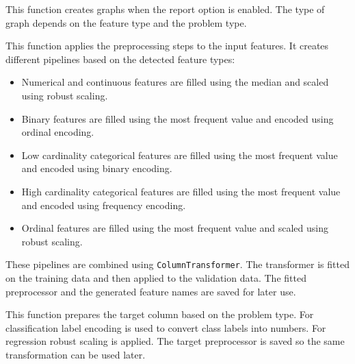 \documentclass[12pt,a4paper]{report}
\begin{document}
\begin{description}
\begin{table}[!htbp]
\begin{tabular}{|p{3.5cm}|p{7cm}|p{4cm}|}
    \end{tabular}
    \end{table}



    \item[\texttt{make\_graphs():}]
    This function creates graphs when the report option is enabled. The type of graph
    depends on the feature type and the problem type.

    \item[\texttt{features\_preprocessing():}]
    This function applies the preprocessing steps to the input features. It creates
    different pipelines based on the detected feature types:
    \begin{itemize}
        \item Numerical and continuous features are filled using the median and scaled
        using robust scaling.
        \item Binary features are filled using the most frequent value and encoded using
        ordinal encoding.
        \item Low cardinality categorical features are filled using the most frequent
        value and encoded using binary encoding.
        \item High cardinality categorical features are filled using the most frequent
        value and encoded using frequency encoding.
        \item Ordinal features are filled using the most frequent value and scaled using
        robust scaling.
    \end{itemize}
    These pipelines are combined using \texttt{ColumnTransformer}. The transformer is
    fitted on the training data and then applied to the validation data. The fitted
    preprocessor and the generated feature names are saved for later use.

    \item[\texttt{target\_preprocessing():}]
    This function prepares the target column based on the problem type. For
    classification label encoding is used to convert class labels into numbers. For regression robust scaling is applied. The target
    preprocessor is saved so the same transformation can be used later.


\end{description}
\end{document}
